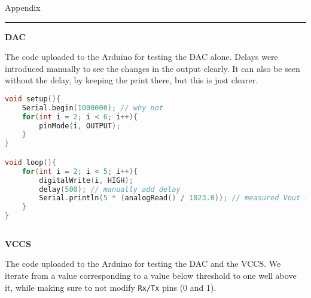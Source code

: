 \newpage
{\large Appendix}
\hrule
\label{appendix}

\textbf{DAC}

The code uploaded to the Arduino for testing the DAC alone. Delays were introduced
manually to see the changes in the output clearly. It can also be seen without the delay,
by keeping the print there, but this is just clearer.

\begin{lstlisting}[language=C++]
void setup(){
    Serial.begin(1000000); // why not
    for(int i = 2; i < 6; i++){
        pinMode(i, OUTPUT);
    }
}

void loop(){
    for(int i = 2; i < 5; i++){
        digitalWrite(i, HIGH);
        delay(500); // manually add delay
        Serial.println(5 * (analogRead() / 1023.0)); // measured Vout in Volts
    }
}
    
\end{lstlisting}

\textbf{VCCS}
\label{appendix:arduino}

The code uploaded to the Arduino for testing the DAC and the VCCS. We iterate 
from a value corresponding to a value below threshold to one well above it, while
making sure to not modify \texttt{Rx/Tx} pins (0 and 1).



